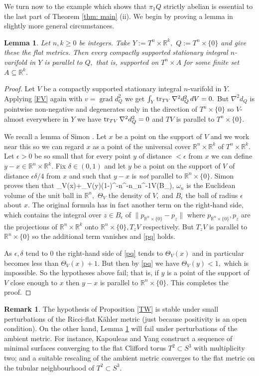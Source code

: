 \documentclass{article}
\DeclareMathOperator{\grad}{grad} \DeclareMathOperator{\Hom}{Hom}
\theoremstyle{plain}%
\newtheorem{lem}[thm]{Lemma}
\theoremstyle{definition}
\newtheorem{rem}[thm]{Remark}
\numberwithin{equation}{section}
\numberwithin{figure}{section}
\def\e#1\e{\begin{equation}#1\end{equation}}
\def\eq{\eqref}
\def\l{\label}
\def\Hom{\mathop{\rm Hom}\nolimits}
\def\ge{\geqslant}
\def\le{\leqslant\nobreak}
\def\R{{\mathbin{\mathbb R}}}
\def\de{\delta}
\def\ep{\epsilon}
\def\om{\omega}
\def\Th{\Theta}
\def\t{\times}
\def\nb{\nabla}
\def\sb{\subseteq}
\begin{document}
We turn now to the example which shows that $\pi_1Q$ strictly abelian is essential to the last part of Theorem \ref{thm: main} (ii).
We begin by proving a lemma in slightly more general circumstances.
\begin{lem}\l{lem: flat}
Let $n,k\ge0$ be integers. Take $Y:=T^n\t\R^k,$ $Q:=T^n\t\{0\}$ and give these the flat metrics.  
Then every compactly supported stationary integral $n$-varifold in $Y$ is parallel to $Q,$ that is, supported on $T^n\t A$ for some finite set $A\sb \R^k.$
\end{lem}
\begin{proof}
Let $V$ be a compactly supported stationary integral $n$-varifold in $Y.$
Applying \eq{FV} again with $v=\grad d_Q^2$ we get
$\int_Y\tr_{TV}\nb^2d_Q^2\,dV=0.$
But $\nb^2d_Q$ is pointwise non-negative and degenerates only in the direction of $T^n\t\{0\}$ so $V$-almost everywhere in $Y$ we have
$\tr_{TV}\nb^2d_Q^2=0$ and $TV$ is parallel to $T^n\t\{0\}.$

We recall a lemma of Simon \cite[Lemma 19.5]{Sm}.
Let $x$ be a point on the support of $V$ and we work near this so we can regard $x$ as a point of the universal cover $\R^n\times\R^k$ of $T^n\times\R^k.$
Let $\ep>0$ be so small that for every point $y$ of distance $<\ep$ from $x$ we can define $y-x\in\R^n\t\R^k.$
Fix $\de\in(0,1)$ and let $y$ be a point on the support of $V$ of distance $\ep\de/4$ from $x$ and such that $y-x$ is {\it not} parallel to $\R^n\t\{0\}.$
Simon \cite[Lemma 19.5]{Sm} proves then that 
\e\l{pq}\Th_V(x)+\Th_V(y)\le(1-\de)^{-n}\ep^{-n}\om_n^{-1}V(B_\ep),\e
where $\om_n$ is the Euclidean volume of the unit ball in $\R^n,$ $\Th_V$ the density of $V,$ and $B_\ep$ the ball of radius $\ep$ about $x.$
The original formula has in fact another term on the right-hand side, which contains the integral over $z\in B_\ep$ of $\|p_{\R^n\times\{0\}}-p_z\|$ where $p_{\R^n\times\{0\}},p_z$ are the projections of $\R^n\times\R^k$ onto $\R^n\times\{0\},T_zV$ respectively. But $T_zV$ is parallel to $\R^n\t\{0\}$ so the additional term vanishes and \eq{pq} holds.  

As $\ep,\de$ tend to $0$ the right-hand side of \eq{pq} tends to $\Th_V(x)$ and in particular becomes less than $\Th_V(x)+1.$ But then by \eq{pq} we have $\Th_V(y)<1,$ which is impossible. So the hypotheses above fail; that is, if $y$ is a point of the support of $V$ close enough to $x$ then $y-x$ is parallel to $\R^n\t\{0\}.$ This completes the proof. 
\end{proof}
\begin{rem}
The hypothesis of Proposition \ref{TW} is stable under small perturbations of the Ricci-flat K\"ahler metric (just because positivity is an open condition). On the other hand, Lemma \ref{lem: flat} will fail under perturbations of the ambient metric.
For instance, Kapouleas and Yang \cite{KY} construct a sequence of minimal surfaces converging to the flat Clifford torus $T^2\subset S^3$ with multiplicity two;
and a suitable rescaling of the ambient metric converges to the flat metric on the tubular neighbourhood of $T^2\subset S^3.$
\end{rem}
\end{document}
